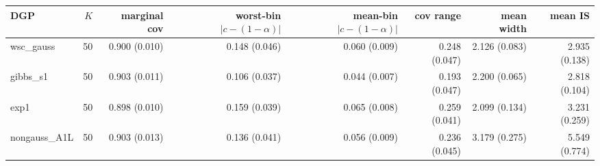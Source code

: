 \begin{tabular}{lrrrrrrr}
\toprule
DGP & $K$ & marginal cov & worst-bin $|c-(1-\alpha)|$ & mean-bin $|c-(1-\alpha)|$ & cov range & mean width & mean IS \\
\midrule
wsc\_gauss & 50 & 0.900 (0.010) & 0.148 (0.046) & 0.060 (0.009) & 0.248 (0.047) & 2.126 (0.083) & 2.935 (0.138) \\
gibbs\_s1 & 50 & 0.903 (0.011) & 0.106 (0.037) & 0.044 (0.007) & 0.193 (0.047) & 2.200 (0.065) & 2.818 (0.104) \\
exp1 & 50 & 0.898 (0.010) & 0.159 (0.039) & 0.065 (0.008) & 0.259 (0.041) & 2.099 (0.134) & 3.231 (0.259) \\
nongauss\_A1L & 50 & 0.903 (0.013) & 0.136 (0.041) & 0.056 (0.009) & 0.236 (0.045) & 3.179 (0.275) & 5.549 (0.774) \\
\bottomrule
\end{tabular}

